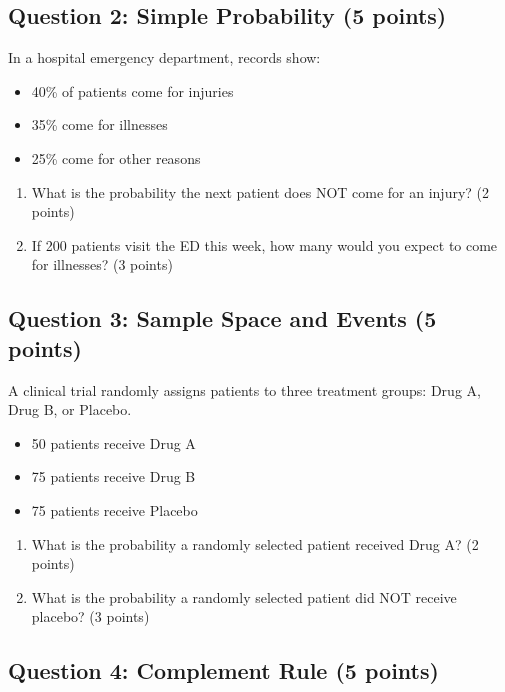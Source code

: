 \documentclass[11pt]{article}
\begin{document}
\vspace{1.5cm}

\subsection*{Question 2: Simple Probability (5 points)}

In a hospital emergency department, records show:
\begin{itemize}
\item 40\% of patients come for injuries
\item 35\% come for illnesses
\item 25\% come for other reasons
\end{itemize}

\begin{enumerate}[label=\alph*)]
\item What is the probability the next patient does NOT come for an injury? (2 points)
\item If 200 patients visit the ED this week, how many would you expect to come for illnesses? (3 points)
\end{enumerate}

\vspace{1.5cm}

\subsection*{Question 3: Sample Space and Events (5 points)}

A clinical trial randomly assigns patients to three treatment groups: Drug A, Drug B, or Placebo.
\begin{itemize}
\item 50 patients receive Drug A
\item 75 patients receive Drug B
\item 75 patients receive Placebo
\end{itemize}

\begin{enumerate}[label=\alph*)]
\item What is the probability a randomly selected patient received Drug A? (2 points)
\item What is the probability a randomly selected patient did NOT receive placebo? (3 points)
\end{enumerate}

\vspace{1.5cm}

\subsection*{Question 4: Complement Rule (5 points)}
\end{document}
